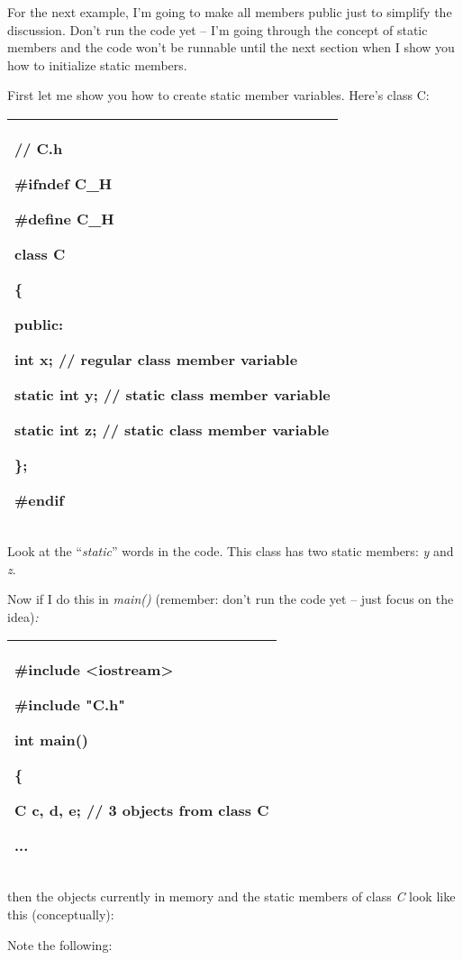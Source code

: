 \documentclass[
]{article}
\begin{document}
For the next example, I'm going to make all members public just to
simplify the discussion. Don't run the code yet -- I'm going through the
concept of static members and the code won't be runnable until the next
section when I show you how to initialize static members.

First let me show you how to create static member variables. Here's
class C:

\begin{longtable}[]{@{}l@{}}
\toprule
\endhead
\begin{minipage}[t]{0.97\columnwidth}\raggedright
// C.h

\#ifndef C\_H

\#define C\_H

class C

\{

public:

int x; // regular class member variable

\textbf{static} int y; // static class member variable

\textbf{static} int z; // static class member variable

\};

\#endif\strut
\end{minipage}\tabularnewline
\bottomrule
\end{longtable}

Look at the ``\emph{static}'' words in the code. This class has two
static members: \emph{y} and \emph{z}.

Now if I do this in \emph{main()} (remember: don't run the code yet --
just focus on the idea)\emph{:}

\begin{longtable}[]{@{}l@{}}
\toprule
\endhead
\begin{minipage}[t]{0.97\columnwidth}\raggedright
\#include \textless iostream\textgreater{}

\#include "C.h"

int main()

\{

C c, d, e; // 3 objects from class C

...\strut
\end{minipage}\tabularnewline
\bottomrule
\end{longtable}

then the objects currently in memory and the static members of class
\emph{C} look like this (conceptually):

Note the following:
\end{document}
